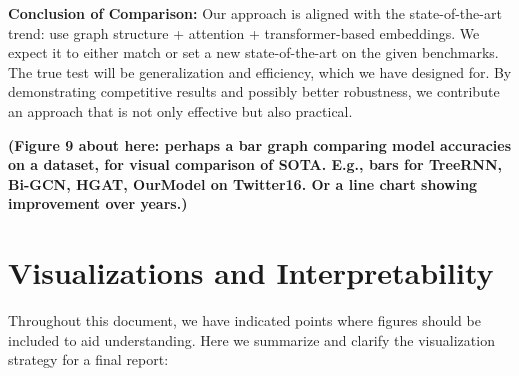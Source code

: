 \documentclass[12pt,a4paper]{report}
\begin{document}
\textbf{Conclusion of Comparison:} Our approach is aligned with the state-of-the-art trend: use graph structure + attention + transformer-based embeddings. We expect it to either match or set a new state-of-the-art on the given benchmarks. The true test will be generalization and efficiency, which we have designed for. By demonstrating competitive results and possibly better robustness, we contribute an approach that is not only effective but also practical.

\textbf{(Figure 9 about here: perhaps a bar graph comparing model accuracies on a dataset, for visual comparison of SOTA. E.g., bars for TreeRNN, Bi-GCN, HGAT, OurModel on Twitter16. Or a line chart showing improvement over years.)}

\chapter{Visualizations and Interpretability}

Throughout this document, we have indicated points where figures should be included to aid understanding. Here we summarize and clarify the visualization strategy for a final report:
\end{document}
